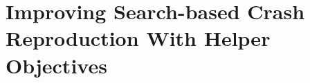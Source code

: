 \chapter{Improving Search-based Crash Reproduction With Helper Objectives}
\label{sec:moho:introduction}








